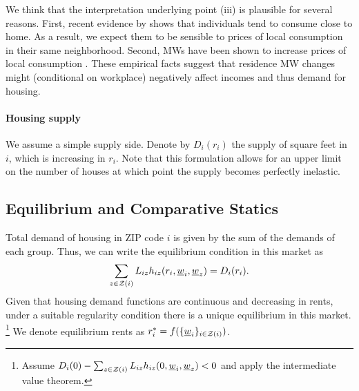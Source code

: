 We think that the interpretation underlying point (iii) is plausible for several 
reasons.
First, recent evidence by \textcite{MiyauchiEtAl2021} shows that individuals tend 
to consume close to home.
As a result, we expect them to be sensible to prices of local consumption in their 
same neighborhood.
Second, MWs have been shown to increase prices of local consumption 
\parencite[e.g.,][]{AllegrettoReich2018, LeungForthcoming}.
These empirical facts suggest that residence MW changes might (conditional on workplace)
negatively affect incomes and thus demand for housing.

\paragraph{Housing supply}

We assume a simple supply side. Denote by $D_i(r_i)$ the supply of square feet in 
$i$, which is increasing in $r_i$.
Note that this formulation allows for an upper limit on the number of houses at 
which point the supply becomes perfectly inelastic.

\subsection{Equilibrium and Comparative Statics}

Total demand of housing in ZIP code $i$ is given by the sum of the demands of each group. 
Thus, we can write the equilibrium condition in this market as
\begin{equation}\label{eq:equilibrium}
	\sum_{z\in\mathcal{Z}(i)} L_{iz} h_{iz} (r_i, \underline{w}_i, \underline{w}_z) = D_i(r_i) .
\end{equation}
Given that housing demand functions are continuous and decreasing in rents, 
under a suitable regularity condition there is a unique equilibrium in this market.%
\footnote{Assume $D_i(0) - \sum_{z\in\mathcal{Z}(i)} L_{iz} h_{iz} (0, \underline{w}_i, \underline{w}_z) < 0$
and apply the intermediate value theorem.}
We denote equilibrium rents as $r^*_i = f(\{\underline{w}_i\}_{i\in\mathcal{Z}(i)})$.


